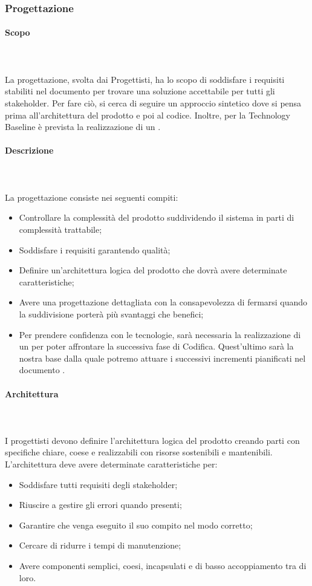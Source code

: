 \subsubsection{Progettazione}
\paragraph{Scopo}\mbox{}\\ \\
La progettazione, svolta dai Progettisti, ha lo scopo di soddisfare i requisiti stabiliti nel documento \AdR{} per trovare una soluzione accettabile per tutti gli stakeholder.
Per fare ciò, si cerca di seguire un approccio sintetico dove si pensa prima all’architettura del prodotto e poi al codice. 
Inoltre, per la Technology Baseline è prevista la realizzazione di un .
\paragraph{Descrizione}\mbox{}\\ \\
La progettazione consiste nei seguenti compiti:
\begin{itemize}
	\item Controllare la complessità del prodotto suddividendo il sistema in parti di complessità trattabile;
	\item Soddisfare i requisiti garantendo qualità;
	\item Definire un’architettura logica del prodotto che dovrà avere determinate caratteristiche;
	\item Avere una progettazione dettagliata con la consapevolezza di fermarsi quando la suddivisione porterà più svantaggi che benefici;
	\item Per prendere confidenza con le tecnologie, sarà necessaria la realizzazione di un  per poter affrontare la successiva fase di Codifica. Quest'ultimo sarà la nostra base dalla quale potremo attuare i successivi incrementi pianificati nel documento \PdP{}.
\end{itemize}

\paragraph{Architettura}\mbox{}\\ \\
I progettisti devono definire l’architettura logica del prodotto creando parti con specifiche chiare, coese e realizzabili con risorse sostenibili e mantenibili. L'architettura deve avere determinate caratteristiche per:
\begin{itemize}
	\item Soddisfare tutti requisiti degli stakeholder;
	\item Riuscire a gestire gli errori quando presenti;
	\item Garantire che venga eseguito il suo compito nel modo corretto;
	\item Cercare di ridurre i tempi di manutenzione;
	\item Avere componenti semplici, coesi, incapsulati e di basso accoppiamento tra di loro.
\end{itemize}

